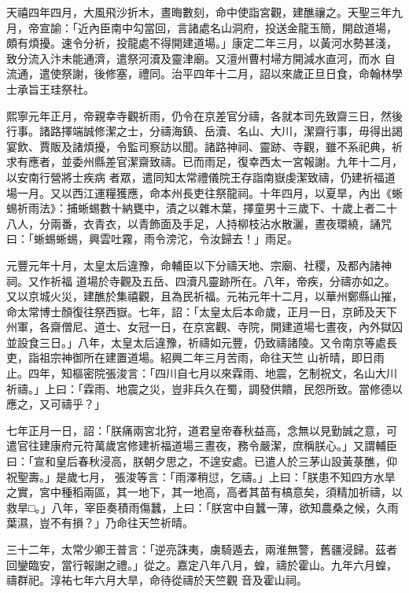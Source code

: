 \begin{pinyinscope}
 天禧四年四月，大風飛沙折木，晝晦數刻，命中使詣宮觀，建醮禳之。天聖三年九月，帝宣諭：「近內臣南中勾當回，言諸處名山洞府，投送金龍玉簡，開啟道場，頗有煩擾。速令分祈，投龍處不得開建道場。」康定二年三月，以黃河水勢甚淺，致分流入汴未能通濟，遣祭河瀆及靈津廟。又澶州曹村埽方開減水直河，而水
 自流通，遣使祭謝，後修塞，禮同。治平四年十二月，詔以來歲正旦日食，命翰林學士承旨王珪祭社。



 熙寧元年正月，帝親幸寺觀祈雨，仍令在京差官分禱，各就本司先致齋三日，然後行事。諸路擇端誠修潔之士，分禱海鎮、岳瀆、名山、大川，潔齋行事，毋得出謁宴飲、賈販及諸煩擾，令監司察訪以聞。諸路神祠、靈跡、寺觀，雖不系祀典，祈求有應者，並委州縣差官潔齋致禱。已而雨足，復幸西太一宮報謝。九年十二月，以安南行營將士疾病
 者眾，遣同知太常禮儀院王存詣南嶽虔潔致禱，仍建祈福道場一月。又以西江運糧獲應，命本州長吏往祭龍祠。十年四月，以夏旱，內出《蜥蜴祈雨法》：捕蜥蜴數十納甕中，漬之以雜木葉，擇童男十三歲下、十歲上者二十八人，分兩番，衣青衣，以青飾面及手足，人持柳枝沾水散灑，晝夜環繞，誦咒曰：「蜥蜴蜥蜴，興雲吐霧，雨令滂沱，令汝歸去！」雨足。



 元豐元年十月，太皇太后違豫，命輔臣以下分禱天地、宗廟、社稷，及都內諸神祠。又作祈福
 道場於寺觀及五岳、四瀆凡靈跡所在。八年，帝疾，分禱亦如之。又以京城火災，建醮於集禧觀，且為民祈福。元祐元年十二月，以華州鄭縣山摧，命太常博士顏復往祭西嶽。七年，詔：「太皇太后本命歲，正月一日，京師及天下州軍，各齋僧尼、道士、女冠一日，在京宮觀、寺院，開建道場七晝夜，內外獄囚並設食三日。」八年，太皇太后違豫，祈禱如元豐，仍致禱諸陵。又令南京等處長吏，詣祖宗神御所在建置道場。紹興二年三月苦雨，命往天竺
 山祈晴，即日雨止。四年，知樞密院張浚言：「四川自七月以來霖雨、地震，乞制祝文，名山大川祈禱。」上曰：「霖雨、地震之災，豈非兵久在蜀，調發供饋，民怨所致。當修德以應之，又可禱乎？」



 七年正月一日，詔：「朕痛兩宮北狩，道君皇帝春秋益高，念無以見勤誠之意，可遣官往建康府元符萬歲宮修建祈福道場三晝夜，務令嚴潔，庶稱朕心。」又謂輔臣曰：「宣和皇后春秋浸高，朕朝夕思之，不遑安處。已遣人於三茅山設黃菉醮，仰祝聖壽。」是歲七月，
 張浚等言：「雨澤稍愆，乞禱。」上曰：「朕患不知四方水旱之實，宮中種稻兩區，其一地下，其一地高，高者其苗有槁意矣，須精加祈禱，以救旱□。」八年，宰臣奏積雨傷蠶，上曰：「朕宮中自蠶一薄，欲知農桑之候，久雨葉濕，豈不有損？」乃命往天竺祈晴。



 三十二年，太常少卿王普言：「逆亮誅夷，虜騎遁去，兩淮無警，舊疆浸歸。茲者回鑾臨安，當行報謝之禮。」從之。嘉定八年八月，蝗，禱於霍山。九年六月蝗，禱群祀。淳祐七年六月大旱，命待從禱於天竺觀
 音及霍山祠。



\end{pinyinscope}